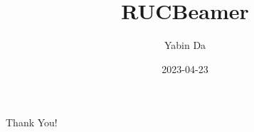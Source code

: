 \documentclass[10pt,ignorenonframetext,,aspectratio=149]{beamer}
\title{RUCBeamer}
\author{Yabin Da}
\date{2023-04-23}
\institute{\normalsize School of Agricultural Economics and Rural
Development}
\begin{document}
\frame{\titlepage}

\begin{frame}
\end{frame}



\begin{frame}
\begin{center}
\textcolor{rucmaroon}{\Huge Thank You!}
\end{center}
\end{frame}
\end{document}
